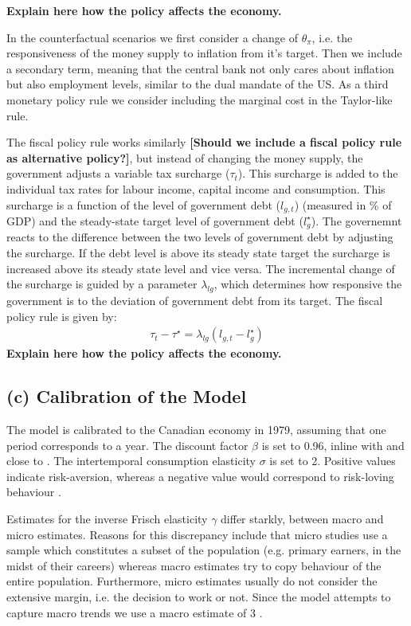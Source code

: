 \documentclass[12pt]{article}
\begin{document}
\textbf{Explain here how the policy affects the economy.}

In the counterfactual scenarios we first consider a change of $\theta_\pi$, i.e. the responsiveness of the money supply to inflation from it's target. Then we include a secondary term, meaning that the central bank not only cares about inflation but also employment levels, similar to the dual mandate of the US. As a third monetary policy rule we consider including the marginal cost in the Taylor-like rule.

The fiscal policy rule works similarly {\textbf{[Should we include a fiscal policy rule as alternative policy?]}}, but instead of changing the money supply, the government adjusts a variable tax surcharge ($\tau_t$). This surcharge is added to the individual tax rates for labour income, capital income and consumption. This surcharge is a function of the level of government debt ($l_{g,t}$) (measured in \% of GDP) and the steady-state target level of government debt ($l^{\star}_{g}$). The governemnt reacts to the difference between the two levels of government debt by adjusting the surcharge. If the debt level is above its steady state target the surcharge is increased above its steady state level and vice versa. The incremental change of the surcharge is guided by a parameter $\lambda_{lg}$, which determines how responsive the government is to the deviation of government debt from its target. The fiscal policy rule is given by:
\begin{align}
    \tau_t - \tau^{\star} = \lambda_{lg} (l_{g,t} - l^{\star}_{g})
\end{align}
\textbf{Explain here how the policy affects the economy.}



\subsection*{(c) Calibration of the Model}
The model is calibrated to the Canadian economy in 1979, assuming that one period corresponds to a year. 
The discount factor $\beta$ is set to 0.96, inline with \textcite{someOilDemandSupply2023} and close to \textcite{corriganToTEMIIIBank2021}. 
The intertemporal consumption elasticity $\sigma$ is set to 2. Positive values indicate risk-aversion, whereas a negative value would correspond to risk-loving behaviour
\parencite{thimmeIntertemporalSubstitutionConsumption2017}.

Estimates for the inverse Frisch elasticity $\gamma$ differ starkly, between macro and micro estimates. Reasons for this discrepancy
include that micro studies use a sample which constitutes a subset of the population (e.g. primary earners, in the midst of their careers) whereas macro 
estimates try to copy behaviour of the entire population. Furthermore, micro estimates usually do not consider the extensive margin, i.e. the decision 
to work or not. Since the model attempts to capture macro trends we use a macro estimate of 3 \parencite{petermanReconcilingMicroMacro2016}. 
\end{document}
